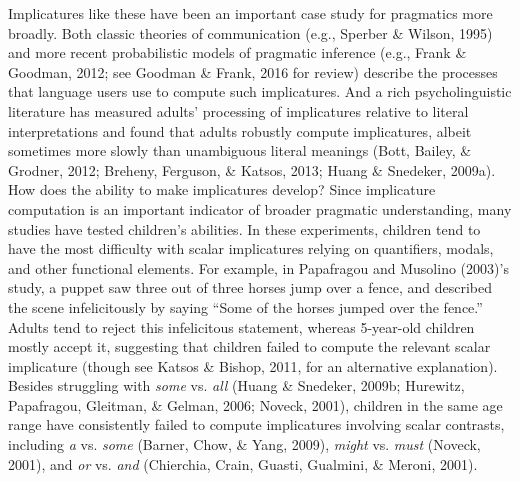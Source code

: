 \documentclass[mask,man]{apa6}
\theoremstyle{definition}
\theoremstyle{definition}
\theoremstyle{definition}
\theoremstyle{remark}
\begin{document}
Implicatures like these have been an important case study for pragmatics
more broadly. Both classic theories of communication (e.g., Sperber \&
Wilson, 1995) and more recent probabilistic models of pragmatic
inference (e.g., Frank \& Goodman, 2012; see Goodman \& Frank, 2016 for
review) describe the processes that language users use to compute such
implicatures. And a rich psycholinguistic literature has measured
adults' processing of implicatures relative to literal interpretations
and found that adults robustly compute implicatures, albeit sometimes
more slowly than unambiguous literal meanings (Bott, Bailey, \& Grodner,
2012; Breheny, Ferguson, \& Katsos, 2013; Huang \& Snedeker, 2009a). How
does the ability to make implicatures develop? Since implicature
computation is an important indicator of broader pragmatic
understanding, many studies have tested children's abilities. In these
experiments, children tend to have the most difficulty with scalar
implicatures relying on quantifiers, modals, and other functional
elements. For example, in Papafragou and Musolino (2003)'s study, a
puppet saw three out of three horses jump over a fence, and described
the scene infelicitously by saying \enquote{Some of the horses jumped
over the fence.} Adults tend to reject this infelicitous statement,
whereas 5-year-old children mostly accept it, suggesting that children
failed to compute the relevant scalar implicature (though see Katsos \&
Bishop, 2011, for an alternative explanation). Besides struggling with
\emph{some} vs. \emph{all} (Huang \& Snedeker, 2009b; Hurewitz,
Papafragou, Gleitman, \& Gelman, 2006; Noveck, 2001), children in the
same age range have consistently failed to compute implicatures
involving scalar contrasts, including \emph{a} vs. \emph{some} (Barner,
Chow, \& Yang, 2009), \emph{might} vs. \emph{must} (Noveck, 2001), and
\emph{or} vs. \emph{and} (Chierchia, Crain, Guasti, Gualmini, \& Meroni,
2001).
\end{document}
